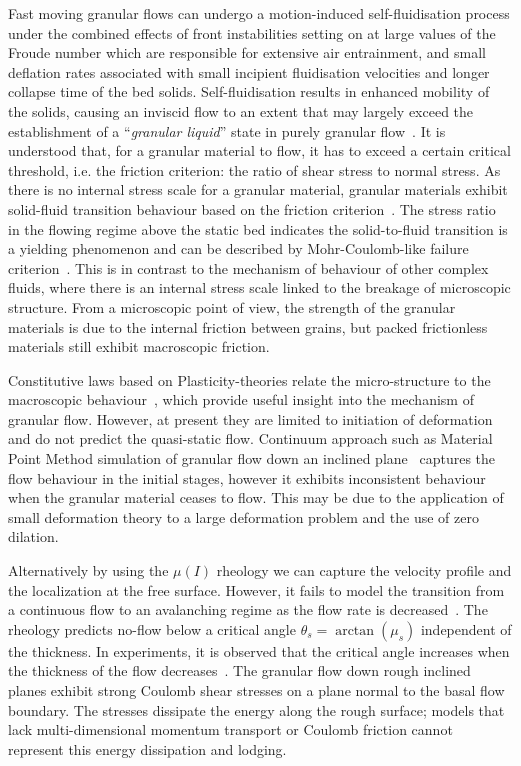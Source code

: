 Fast moving granular flows can undergo a motion-induced self-fluidisation 
process under the combined effects of front instabilities setting on at large 
values of the Froude number which are responsible for extensive air 
entrainment, and small deflation rates associated with small incipient 
fluidisation velocities and longer collapse time of the bed solids. 
Self-fluidisation results in enhanced mobility of the solids, causing an 
inviscid flow to an extent that may largely exceed the establishment of a 
``\textit{granular liquid}'' state in purely granular 
flow~\citep{Bareschino2008}. It is understood that, for a granular material to 
flow, it has to exceed a certain critical threshold, i.e. the friction 
criterion: the ratio of shear stress to normal stress. As there is no internal 
stress scale for a granular material, granular materials exhibit solid-fluid 
transition behaviour based on the friction criterion~\citep{Forterre2008}. The 
stress ratio in the flowing regime above the static bed indicates the 
solid-to-fluid transition is a yielding phenomenon and can be described by 
Mohr-Coulomb-like failure criterion~\citep{Zhang1992}. This is in contrast to 
the mechanism of behaviour of other complex fluids, where there is an internal 
stress scale linked to the breakage of microscopic structure. From a 
microscopic point of view, the strength of the granular materials is due to the 
internal friction between grains, but packed frictionless materials still 
exhibit macroscopic friction.

Constitutive laws based on Plasticity-theories relate the micro-structure to 
the macroscopic behaviour~\citep{Roux2002}, which provide useful insight into 
the mechanism of granular flow. However, at present they are limited to 
initiation of deformation and do not predict the quasi-static flow. Continuum 
approach such as Material Point Method simulation of granular flow down an 
inclined plane~\citep{Abe2006,Bandara2013} captures the flow behaviour in the 
initial stages, however it exhibits inconsistent behaviour when the granular 
material ceases to flow. This may be due to the application of small 
deformation theory to a large deformation problem and the use of zero dilation. 

Alternatively by using the $\mu(\textit{I})$ rheology we can capture the 
velocity profile and the localization at the free surface. However, it fails to 
model the transition from a continuous flow to an avalanching regime as the 
flow rate is decreased~\citep{Pouliquen2006}. The rheology predicts no-flow 
below a critical angle $\theta_s = \arctan(\mu_s)$ independent of the 
thickness. In experiments, it is observed that the critical angle increases 
when the thickness of the flow decreases~\citep{Pouliquen1999}. The granular 
flow down rough inclined planes exhibit strong Coulomb shear stresses on a 
plane normal to the basal flow boundary. The stresses dissipate the energy 
along the rough surface; models that lack multi-dimensional momentum transport 
or Coulomb friction cannot represent this energy dissipation and lodging.

